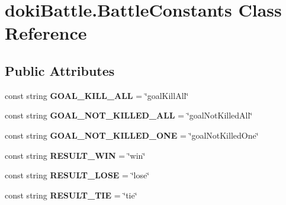 \hypertarget{classdoki_battle_1_1_battle_constants}{}\section{doki\+Battle.\+Battle\+Constants Class Reference}
\label{classdoki_battle_1_1_battle_constants}
\subsection*{Public Attributes}
\begin{DoxyCompactItemize}
\item 
const string {\bfseries G\+O\+A\+L\+\_\+\+K\+I\+L\+L\+\_\+\+A\+LL} = \char`\"{}goal\+Kill\+All\char`\"{}\hypertarget{classdoki_battle_1_1_battle_constants_a2e817cd44562f47c5af778b434ab82a9}{}\label{classdoki_battle_1_1_battle_constants_a2e817cd44562f47c5af778b434ab82a9}

\item 
const string {\bfseries G\+O\+A\+L\+\_\+\+N\+O\+T\+\_\+\+K\+I\+L\+L\+E\+D\+\_\+\+A\+LL} = \char`\"{}goal\+Not\+Killed\+All\char`\"{}\hypertarget{classdoki_battle_1_1_battle_constants_abb4ffbcc986d7bb67f4ee306a314372e}{}\label{classdoki_battle_1_1_battle_constants_abb4ffbcc986d7bb67f4ee306a314372e}

\item 
const string {\bfseries G\+O\+A\+L\+\_\+\+N\+O\+T\+\_\+\+K\+I\+L\+L\+E\+D\+\_\+\+O\+NE} = \char`\"{}goal\+Not\+Killed\+One\char`\"{}\hypertarget{classdoki_battle_1_1_battle_constants_ac63984c32371b7746a3b682300ff921a}{}\label{classdoki_battle_1_1_battle_constants_ac63984c32371b7746a3b682300ff921a}

\item 
const string {\bfseries R\+E\+S\+U\+L\+T\+\_\+\+W\+IN} = \char`\"{}win\char`\"{}\hypertarget{classdoki_battle_1_1_battle_constants_ad1b0f5d18128c9e2f13a3619421a002f}{}\label{classdoki_battle_1_1_battle_constants_ad1b0f5d18128c9e2f13a3619421a002f}

\item 
const string {\bfseries R\+E\+S\+U\+L\+T\+\_\+\+L\+O\+SE} = \char`\"{}lose\char`\"{}\hypertarget{classdoki_battle_1_1_battle_constants_ab7dae2ba3e4f8b07ef53a89a8dd1c147}{}\label{classdoki_battle_1_1_battle_constants_ab7dae2ba3e4f8b07ef53a89a8dd1c147}

\item 
const string {\bfseries R\+E\+S\+U\+L\+T\+\_\+\+T\+IE} = \char`\"{}tie\char`\"{}\hypertarget{classdoki_battle_1_1_battle_constants_a6faa81ea1bc6799e366722572f067c00}{}\label{classdoki_battle_1_1_battle_constants_a6faa81ea1bc6799e366722572f067c00}


\end{DoxyCompactItemize}
